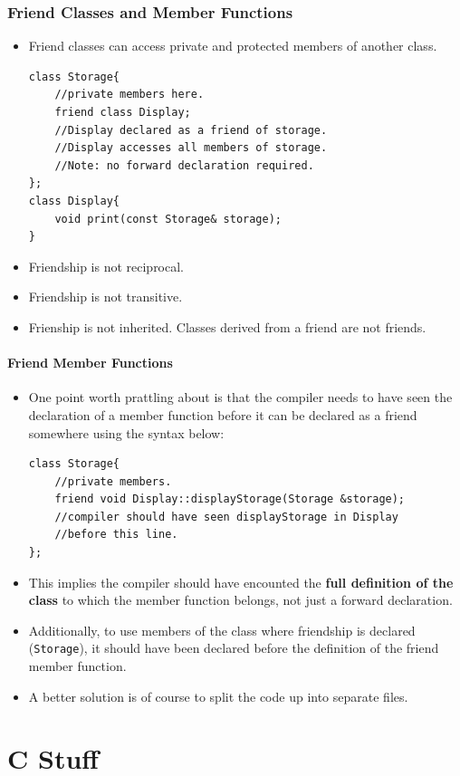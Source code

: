 \documentclass{report}
\begin{document}
\subsection{Friend Classes and Member Functions}
\begin{itemize}
    \item Friend classes can access private and protected members of another class.
\begin{lstlisting}
class Storage{
    //private members here.
    friend class Display;
    //Display declared as a friend of storage.
    //Display accesses all members of storage.
    //Note: no forward declaration required.
};
class Display{
    void print(const Storage& storage);
}
\end{lstlisting}
\item Friendship is not reciprocal.
\item Friendship is not transitive.
\item Frienship is not inherited. Classes derived from a friend are not friends.
\end{itemize}
\subsubsection{Friend Member Functions}
\begin{itemize}
\item One point worth prattling about is that the compiler needs to have seen the declaration of a member function before it can be declared as a friend somewhere using the syntax below:
\begin{lstlisting}
class Storage{
    //private members.
    friend void Display::displayStorage(Storage &storage);
    //compiler should have seen displayStorage in Display 
    //before this line.
};
\end{lstlisting} 
\item This implies the compiler should have encounted the \textbf{full definition of the class} to which the member function belongs, not just a forward declaration.
\item Additionally, to use members of the class where friendship is declared (\texttt{Storage}), it should have been declared before the definition of the friend member function.
\item A better solution is of course to split the code up into separate files.
\end{itemize}
\chapter{C Stuff}
\end{document}
